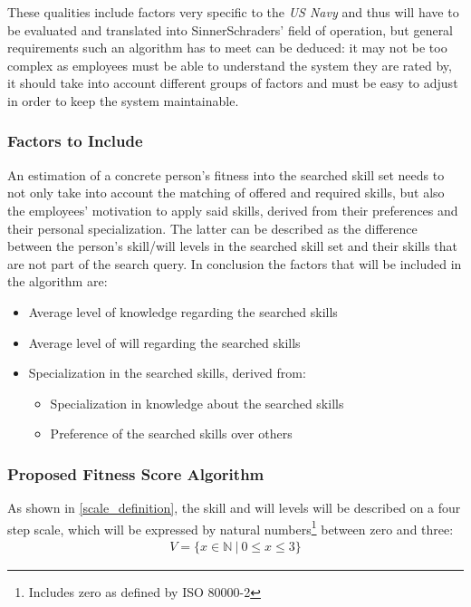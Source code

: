 \label{customizable}
These qualities include factors very specific to the \textit{US Navy} and thus will have to be evaluated and translated into SinnerSchraders' field of operation, but general requirements such an algorithm has to meet can be deduced: it may not be too complex as employees must be able to understand the system they are rated by, it should take into account different groups of factors and must be easy to adjust in order to keep the system maintainable.

\subsubsection{Factors to Include}
An estimation of a concrete person's fitness into the searched skill set needs to not only take into account the matching of offered and required skills, but also the employees' motivation to apply said skills, derived from their preferences and their personal specialization. The latter can be described as the difference between the person's skill/will levels in the searched skill set and their skills that are not part of the search query. In conclusion the factors that will be included in the algorithm are:
\begin{itemize}
  \item Average level of knowledge regarding the searched skills
  \item Average level of will regarding the searched skills
  \item Specialization in the searched skills, derived from:
  \begin{itemize}
    \item Specialization in knowledge about the searched skills
    \item Preference of the searched skills over others
  \end{itemize}
\end{itemize}


\subsubsection{Proposed Fitness Score Algorithm}
\label{fitnessscore_impl}
As shown in \ref{scale_definition}, the skill and will levels will be described on a four step scale, which will be expressed by natural numbers\footnote{Includes zero as defined by ISO 80000-2} between zero and three:
\begin{gather*}
  V = \{ x \in \mathbb{N} \ | \  0 \leq x \leq 3\}
\end{gather*}

